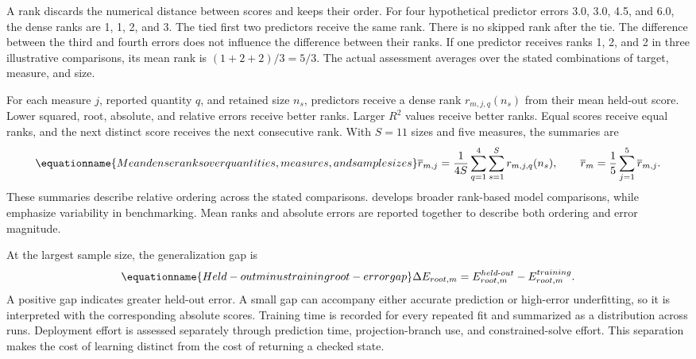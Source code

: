 A rank discards the numerical distance between scores and keeps their order. For four hypothetical predictor errors 3.0, 3.0, 4.5, and 6.0, the dense ranks are 1, 1, 2, and 3. The tied first two predictors receive the same rank. There is no skipped rank after the tie. The difference between the third and fourth errors does not influence the difference between their ranks. If one predictor receives ranks 1, 2, and 2 in three illustrative comparisons, its mean rank is \((1+2+2)/3=5/3\). The actual assessment averages over the stated combinations of target, measure, and size.

For each measure \(j\), reported quantity \(q\), and retained size \(n_s\), predictors receive a dense rank \(r_{m,j,q}(n_s)\) from their mean held-out score. Lower squared, root, absolute, and relative errors receive better ranks. Larger \(R^2\) values receive better ranks. Equal scores receive equal ranks, and the next distinct score receives the next consecutive rank. With \(S=11\) sizes and five measures, the summaries are
\begin{equation}
\equationname{Mean dense ranks over quantities, measures, and sample sizes}
\label{eq:icsor_dense_rank}
\overline r_{m,j}=\frac{1}{4S}\sum_{q=1}^{4}\sum_{s=1}^{S}r_{m,j,q}(n_s),
\qquad
\overline r_m=\frac{1}{5}\sum_{j=1}^{5}\overline r_{m,j}.
\end{equation}
These summaries describe relative ordering across the stated comparisons. \citet{Demsar2006} develops broader rank-based model comparisons, while \citet{Shevchenko2024} emphasize variability in benchmarking. Mean ranks and absolute errors are reported together to describe both ordering and error magnitude.

At the largest sample size, the generalization gap is
\begin{equation}
\equationname{Held-out minus training root-error gap}
\label{eq:icsor_generalization_gap}
\Delta E_{root,m}=E_{root,m}^{held\text{-}out}-E_{root,m}^{training}.
\end{equation}
A positive gap indicates greater held-out error. A small gap can accompany either accurate prediction or high-error underfitting, so it is interpreted with the corresponding absolute scores. Training time is recorded for every repeated fit and summarized as a distribution across runs. Deployment effort is assessed separately through prediction time, projection-branch use, and constrained-solve effort. This separation makes the cost of learning distinct from the cost of returning a checked state.

